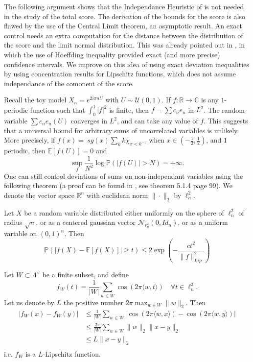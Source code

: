 The following argument shows that the Independance Heuristic of \cite{} is not needed in the study of the total score. The derivation of the bounds for the score is also flawed by the use of the Central Limit theorem, an asymptotic result. An exact control needs an extra computation for the distance between the distribution of the score and the limit normal distribution. This was already pointed out in \cite{}, in which the use of Hoeffding inequality provided exact (and more precise) confidence intervals. We improve on this idea of using exact deviation inequalities by using concentration results for Lipschitz functions, which does not assume independance of the comonent of the score.     

Recall the toy model $X_n = e^{2i\pi nU}$ with $U\sim \mathcal U(0,1)$. If $f : \mathbb R \rightarrow \mathbb C$ is any $1$-periodic function such that $\int_0^1 |f|^2$ is finite, then $f = \sum c_n e_n $ in $L^2$. The random variable $\sum c_n e_n(U)$ converges in $L^2$, and can take any value of $f$. This suggests that a universal bound for arbitrary sums of uncorrelated variables is unlikely. More precisely, if $f(x) = \ sg(x)\sum_k k \chi_{x < k^{-1} } $ when $x\in (-\frac{1}{2},\frac{1}{2})$, and $1$ periodic, then $\mathbb E[f(U)] = 0$ and 
$$\sup_f \frac{1}{N^2}\log \mathbb P(|f(U)| > N) = +\infty .$$ 
One can still control deviations of sums on non-independant variables using the following theorem (a proof can be found in \cite{vershynin2018high}, see theorem 5.1.4 page 99). We denote the vector space $\mathbb R^n$ with euclidean norm $\|\cdot\|_2$ by $\ell^2_n$.

\begin{theorem}
Let $X$ be a random variable distributed either uniformly on the sphere of $\ell^2_n$ of radius $\sqrt n$, or as a centered gaussian vector $\mathcal N_{\ell^2_n}(0, Id_n)$, or as a uniform variable on $(0,1)^n$. Then 
$$ \mathbb  P\left(|f(X) -\mathbb E[f(X)]| \geq t\right) \leq 2\exp{\left(-\frac{ct^2}{\|f\|^2_{Lip}} \right)}$$
\end{theorem}

Let $W\subset \Lambda^\vee$ be a finite subset, and define 
$$f_W(t) = \frac{1}{|W|}\sum_{w\in W} \cos(2\pi \langle w , t \rangle) \quad \forall t \in \ell^2_n.$$
Let us denote by $L$ the positive number $2\pi\max_{w\in W} \|w\|_2$. Then
\[\begin{split}
|f_W(x) -f_W(y)| & \leq \frac{1}{|W|}\sum_{w\in W} |\cos(2\pi \langle w , x \rangle ) -\cos(2\pi \langle w , y \rangle) | \\
		 & \leq \frac{2\pi}{|W|}\sum_{w\in W} \|w\|_2 \|x-y\|_2\\
		 & \leq L\|x-y\|_2\\ 
\end{split}\]
i.e. $f_W$ is a $L$-Lipschitz function.  

